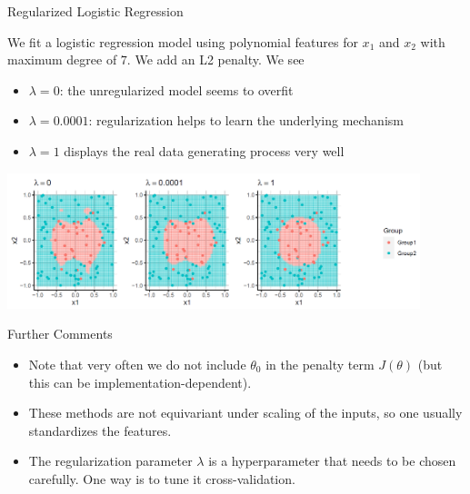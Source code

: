 \begin{frame}{Regularized Logistic Regression}

We fit a logistic regression model using polynomial features for \(x_1\)
and \(x_2\) with maximum degree of \(7\). We add an L2 penalty. We
see

\begin{itemize}

\item
  \(\lambda = 0\): the unregularized model seems to overfit
\item
  \(\lambda = 0.0001\): regularization helps to learn the underlying
  mechanism
\item
  \(\lambda = 1\) displays the real data generating process very well
\end{itemize}

\scriptsize

\begin{center}
\includegraphics[width=0.9\textwidth]{plots/regularized-logistic-reg.png}
\end{center}

\normalsize 

\end{frame}

\begin{frame}{Further Comments}


\begin{itemize}
\item Note that very often we do not include $\theta_0$ in the penalty term $J(\theta)$ (but this can be implementation-dependent).
\item These methods are not equivariant under scaling of the inputs, so one usually standardizes the features.
\item The regularization parameter \(\lambda\) is a hyperparameter that needs
to be chosen carefully. One way is to tune it cross-validation.
\end{itemize}

\end{frame}

